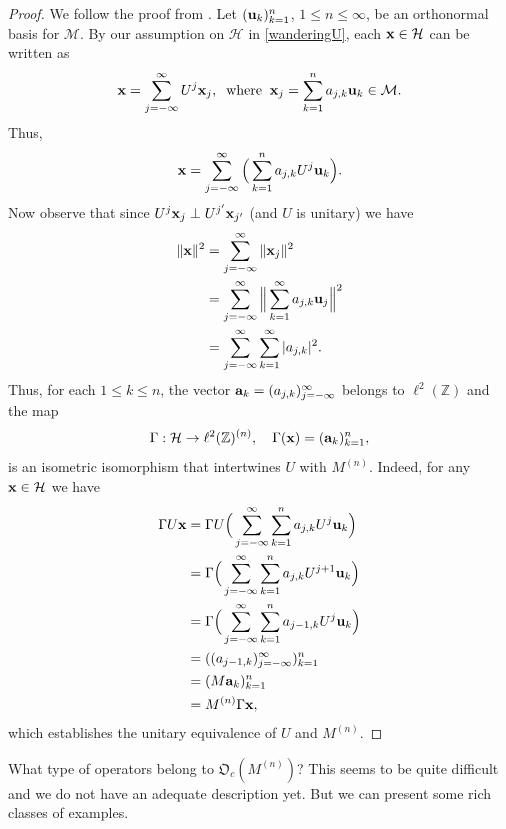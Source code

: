 \documentclass{dis}
\theoremstyle{plain}
\theoremstyle{definition}
\def\Z{\mathbb{Z}}
\renewcommand{\leq}{\leqslant}
\renewcommand{\vec}[1]{{\bf #1}}
\newcommand{\0}{{\color{lightgray}0}}
\begin{document}
\begin{proof}
We follow the proof from \cite{MR4866296}. Let $(\vec{u}_k)_{k = 1}^{n}$, $1 \leq n \leq \infty$,  be an orthonormal basis for $\mathcal{M}$. By our assumption on $\mathcal{H}$ in \eqref{wanderingU}, each $\vec{x} \in \mathcal{H}$ can be written as 
$$\vec{x} = \sum_{j = -\infty}^{\infty} U^{j} \vec{x}_j, \; \; \mbox{where} \; \; \vec{x}_{j} = \sum_{k = 1}^{n} a_{j, k} \vec{u}_k \in \mathcal{M}.$$
Thus, 
$$\vec{x} = \sum_{j = -\infty}^{\infty} \Big(\sum_{k = 1}^{n} a_{j, k} U^{j} \vec{u}_{k}\Big).$$
Now observe that since $U^{j} \vec{x}_j \perp U^{j'} \vec{x}_{j'}$ (and $U$ is unitary) we have 
\begin{align*}
\|\vec{x}\|^2 & = \sum_{j = -\infty}^{\infty} \|\vec{x}_{j}\|^2\\
& = \sum_{j = -\infty}^{\infty} \Big\|\sum_{k = 1}^{\infty} a_{j, k} \vec{u}_j \Big\|^2\\
& = \sum_{j = -\infty}^{\infty} \sum_{k = 1}^{\infty} |a_{j, k}|^2.
\end{align*}
Thus, for each $1 \leq k \leq n$, the vector $\vec{a}_{k} = (a_{j, k})_{j = -\infty}^{\infty}$ belongs to $\ell^{2}(\Z)$ and 
the map 
$$\Gamma: \mathcal{H} \to \ell^2(\Z)^{(n)}, \quad 
\Gamma(\vec{x}) = (\vec{a}_{k})_{k = 1}^{n},$$ is an isometric isomorphism that intertwines $U$ with $M^{(n)}$. Indeed, for any $\vec{x} \in \mathcal{H}$ we have  
\begin{align*}
\Gamma U \vec{x} & = \Gamma U\Big(\sum_{j = -\infty}^{\infty} \sum_{k = 1}^{n} a_{j, k} U^{j} \vec{u}_k\Big)\\
& = \Gamma \Big(\sum_{j = -\infty}^{\infty} \sum_{k = 1}^{n} a_{j, k} U^{j + 1} \vec{u}_k\Big)\\
& = \Gamma \Big(\sum_{j = -\infty}^{\infty} \sum_{k = 1}^{n} a_{j - 1, k} U^{j} \vec{u}_k\Big)\\
& = ((a_{j - 1, k})_{j = -\infty}^{\infty})_{k = 1}^{n}\\
& = (M \vec{a}_{k})_{k = 1}^{n}\\
& = M^{(n)} \Gamma \vec{x},
\end{align*}
which establishes the unitary equivalence of $U$ and $M^{(n)}$. 
\end{proof}


What type of operators belong to $\mathfrak{O}_c(M^{(n)})$? This seems to be quite difficult and we do not have an adequate description yet. But we can present some rich classes of examples. 
\end{document}
